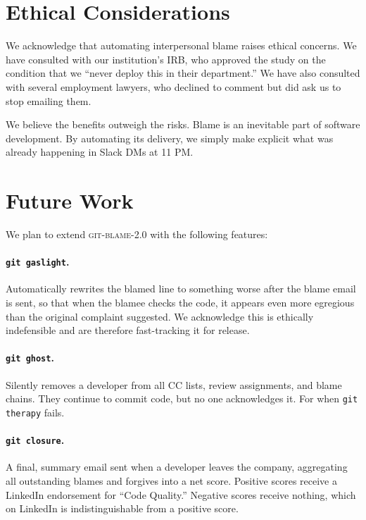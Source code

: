 \documentclass{sigtbd}
\begin{document}
\section{Ethical Considerations}

We acknowledge that automating interpersonal blame raises ethical concerns. We have consulted with our institution's IRB, who approved the study on the condition that we ``never deploy this in their department.'' We have also consulted with several employment lawyers, who declined to comment but did ask us to stop emailing them.

We believe the benefits outweigh the risks. Blame is an inevitable part of software development. By automating its delivery, we simply make explicit what was already happening in Slack DMs at 11 PM.

\section{Future Work}

We plan to extend \textsc{git-blame-2.0} with the following features:

\paragraph{\texttt{git gaslight}.} Automatically rewrites the blamed line to something worse after the blame email is sent, so that when the blamee checks the code, it appears even more egregious than the original complaint suggested. We acknowledge this is ethically indefensible and are therefore fast-tracking it for release.

\paragraph{\texttt{git ghost}.} Silently removes a developer from all CC lists, review assignments, and blame chains. They continue to commit code, but no one acknowledges it. For when \texttt{git therapy} fails.

\paragraph{\texttt{git closure}.} A final, summary email sent when a developer leaves the company, aggregating all outstanding blames and forgives into a net score. Positive scores receive a LinkedIn endorsement for ``Code Quality.'' Negative scores receive nothing, which on LinkedIn is indistinguishable from a positive score.
\end{document}
